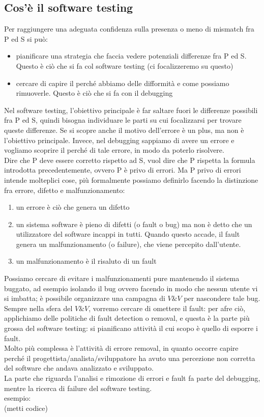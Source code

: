 \documentclass{article}
\begin{document}
\subsection{Cos'è il software testing}
Per raggiungere una adeguata confidenza sulla presenza o meno di mismatch fra P ed S si può:
\begin{itemize}
\item pianificare una strategia che faccia vedere potenziali differenze fra P ed S. Questo è ciò che si fa col software testing (ci focalizzeremo su questo)
\item cercare di capire il perché abbiamo delle difformità e come possiamo rimuoverle. Questo è ciò che si fa con il debugging
\end{itemize}
Nel software testing, l'obiettivo principale è far saltare fuori le differenze possibili fra P ed S, quindi bisogna individuare le parti su cui focalizzarsi per trovare queste differenze. Se si scopre anche il motivo dell'errore è un plus, ma non è l'obiettivo principale. Invece, nel debugging sappiamo di avere un errore e vogliamo scoprire il perché di tale errore, in modo da poterlo risolvere.\\ Dire che P deve essere corretto rispetto ad S, vuol dire che P rispetta la formula introdotta precedentemente, ovvero P è privo di errori. Ma P privo di errori intende molteplici cose, più formalmente possiamo definirlo facendo la distinzione fra errore, difetto e malfunzionamento:
\begin{enumerate}
\item un errore è ciò che genera un difetto
\item un sistema software è pieno di difetti (o fault o bug) ma non è detto che un utilizzatore del software incappi in tutti. Quando questo accade, il fault genera un malfunzionamento (o failure), che viene percepito dall'utente.
\item un malfunzionamento è il risaluto di un fault
\end{enumerate}
Possiamo cercare di evitare i malfunzionamenti pure mantenendo il sistema buggato, ad esempio isolando il bug ovvero facendo in modo che nessun utente vi si imbatta; è possibile organizzare una campagna di $V\&V$ per nascondere tale bug.\\ Sempre nella sfera del $V\&V$, vorremo cercare di omettere il fault: per afre ciò, applichiamo delle politiche di fault detection o removal, e questa è la parte più grossa del software testing: si pianificano attività il cui scopo è quello di esporre i fault.\\ Molto più complessa è l'attività di errore removal, in quanto occorre capire perché il progettista/analista/sviluppatore ha avuto una percezione non corretta del software che andava analizzato e sviluppato.\\ La parte che riguarda l'analisi e rimozione di errori e fault fa parte del debugging, mentre la ricerca di failure del software testing.\\ esempio:\\ (metti codice)
\end{document}
